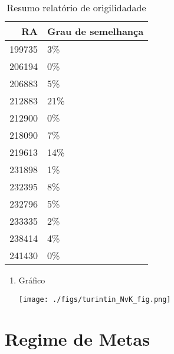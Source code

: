 \documentclass[11pt]{article}
\begin{document}
\begin{table}[htbp]
\caption{\label{TurnitinNvK}Resumo relatório de origilidadade}
\centering
\begin{tabular}{rl}
\hline
RA & Grau de semelhança\\
\hline
199735 & 3\%\\
206194 & 0\%\\
206883 & 5\%\\
212883 & 21\%\\
212900 & 0\%\\
218090 & 7\%\\
219613 & 14\%\\
231898 & 1\%\\
232395 & 8\%\\
232796 & 5\%\\
233335 & 2\%\\
238414 & 4\%\\
241430 & 0\%\\
\hline
\end{tabular}
\end{table}
\begin{enumerate}
\item Gráfico
\label{sec:org82442ea}
\begin{center}
\texttt{[image: ./figs/turintin\_NvK\_fig.png]}
\end{center}
\end{enumerate}

\section{Regime de Metas}
\label{sec:org132ae17}
\end{document}
